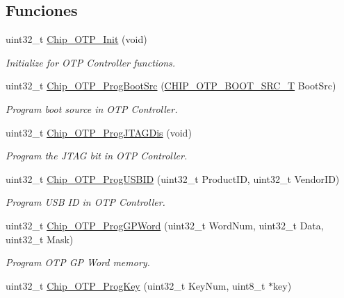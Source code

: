 \subsection*{Funciones}
\begin{DoxyCompactItemize}
\item 
uint32\+\_\+t \hyperlink{group___o_t_p__18_x_x__43_x_x_ga511e3cb6017233783efebf0c9675cc97}{Chip\+\_\+\+O\+T\+P\+\_\+\+Init} (void)
\begin{DoxyCompactList}\small\item\em Initialize for O\+TP Controller functions. \end{DoxyCompactList}\item 
uint32\+\_\+t \hyperlink{group___o_t_p__18_x_x__43_x_x_gafefbdff9c8b9d1f5dd79a8dff3a44e08}{Chip\+\_\+\+O\+T\+P\+\_\+\+Prog\+Boot\+Src} (\hyperlink{group___o_t_p__18_x_x__43_x_x_gada36d39d34c8821f0416a852faa926f6}{C\+H\+I\+P\+\_\+\+O\+T\+P\+\_\+\+B\+O\+O\+T\+\_\+\+S\+R\+C\+\_\+T} Boot\+Src)
\begin{DoxyCompactList}\small\item\em Program boot source in O\+TP Controller. \end{DoxyCompactList}\item 
uint32\+\_\+t \hyperlink{group___o_t_p__18_x_x__43_x_x_gac6f321b6c7c397b3338c3ebe81d4d01f}{Chip\+\_\+\+O\+T\+P\+\_\+\+Prog\+J\+T\+A\+G\+Dis} (void)
\begin{DoxyCompactList}\small\item\em Program the J\+T\+AG bit in O\+TP Controller. \end{DoxyCompactList}\item 
uint32\+\_\+t \hyperlink{group___o_t_p__18_x_x__43_x_x_ga040917e9f2de58ca6cbff2993a5232b9}{Chip\+\_\+\+O\+T\+P\+\_\+\+Prog\+U\+S\+B\+ID} (uint32\+\_\+t Product\+ID, uint32\+\_\+t Vendor\+ID)
\begin{DoxyCompactList}\small\item\em Program U\+SB ID in O\+TP Controller. \end{DoxyCompactList}\item 
uint32\+\_\+t \hyperlink{group___o_t_p__18_x_x__43_x_x_gae9fc592f60829d5aefd72c9dbe83a58a}{Chip\+\_\+\+O\+T\+P\+\_\+\+Prog\+G\+P\+Word} (uint32\+\_\+t Word\+Num, uint32\+\_\+t Data, uint32\+\_\+t Mask)
\begin{DoxyCompactList}\small\item\em Program O\+TP GP Word memory. \end{DoxyCompactList}\item 
uint32\+\_\+t \hyperlink{group___o_t_p__18_x_x__43_x_x_gab94e93611ec4efa732ad045c471d646c}{Chip\+\_\+\+O\+T\+P\+\_\+\+Prog\+Key} (uint32\+\_\+t Key\+Num, uint8\+\_\+t $\ast$key)

\end{DoxyCompactItemize}
